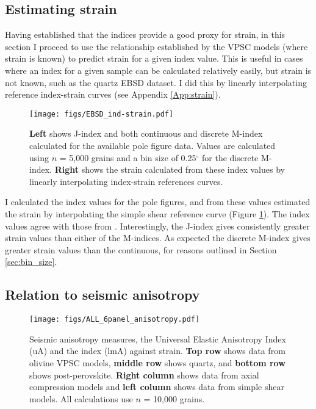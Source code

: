 \documentclass[a4paper,12pt,twoside]{report}
\numberwithin{equation}{chapter}
\begin{document}
\subsection{Estimating strain}

Having established that the indices provide a good proxy for strain, in this section I proceed to use the relationship established by the VPSC models (where strain is known) to predict strain for a given index value. This is useful in cases where an index for a given sample can be calculated relatively easily, but strain is not known, such as the quartz EBSD dataset. I did this by linearly interpolating reference index-strain curves (see Appendix \ref{App:strain}).


\begin{figure}[h]
  \centering
    \texttt{[image: figs/EBSD\_ind-strain.pdf]}
  \caption[Relationship of indices to strain (quartz EBSD)]{\textbf{Left} shows J-index and both continuous and discrete M-index calculated for the available pole figure data. Values are calculated using $n$ = 5,000 grains and a bin size of 0.25$^\circ$ for the discrete M-index. \textbf{Right} shows the strain calculated from these index values by linearly interpolating index-strain references curves.} 
  \label{fig:indices_vs_strain_qtz_EBSD}
\end{figure} 

I calculated the index values for the pole figures, and from these values estimated the strain by interpolating the simple shear reference curve (Figure \ref{fig:indices_vs_strain_qtz_EBSD}). The index values agree with those from \cite{ParsonsThesis}. Interestingly, the J-index gives consistently greater strain values than either of the M-indices. As expected the discrete M-index gives greater strain values than the continuous, for reasons outlined in Section \ref{sec:bin_size}.  

\subsection{Relation to seismic anisotropy}


\begin{figure*}[p]
  \centering
    \texttt{[image: figs/ALL\_6panel\_anisotropy.pdf]}
  \caption[Anisotropy measures and strain]{Seismic anisotropy measures, the Universal Elastic Anisotropy Index (uA) and the \cite{Ledbetter2006} index (lmA) against strain. \textbf{Top row} shows data from olivine VPSC models, \textbf{middle row} shows quartz, and \textbf{bottom row} shows post-perovskite. \textbf{Right column} shows data from axial compression models and \textbf{left column} shows data from simple shear models. All calculations use $n$ = 10,000 grains.} 
  \label{fig:ani_vs_strain}
\end{figure*} 
\end{document}

